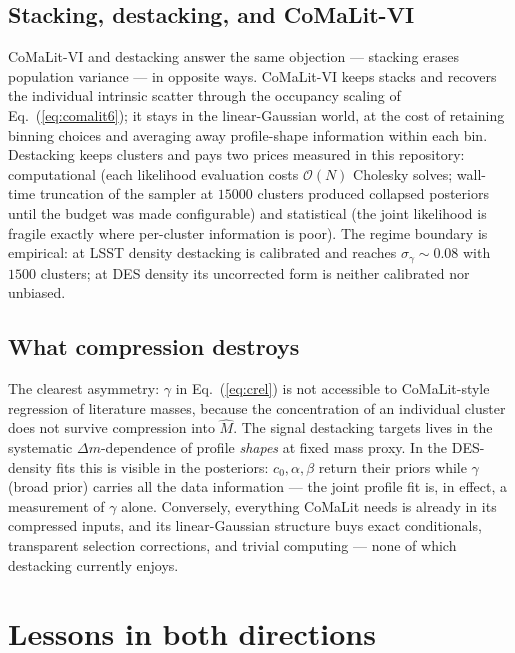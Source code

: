 \documentclass[11pt,a4paper]{article}
\begin{document}
\subsection{Stacking, destacking, and CoMaLit-VI}

CoMaLit-VI and destacking answer the same objection --- stacking erases
population variance --- in opposite ways. CoMaLit-VI keeps stacks and
recovers the individual intrinsic scatter through the occupancy scaling of
Eq.~(\ref{eq:comalit6}); it stays in the linear-Gaussian world, at the cost
of retaining binning choices and averaging away profile-shape information
within each bin. Destacking keeps clusters and pays two prices measured in
this repository: computational (each likelihood evaluation costs
$\mathcal{O}(N)$ Cholesky solves; wall-time truncation of the sampler at
$15000$ clusters produced collapsed posteriors until the budget was made
configurable) and statistical (the joint likelihood is fragile exactly
where per-cluster information is poor). The regime boundary is empirical:
at LSST density destacking is calibrated and reaches
$\sigma_\gamma\!\sim\!0.08$ with $1500$ clusters; at DES density its
uncorrected form is neither calibrated nor unbiased.

\subsection{What compression destroys}

The clearest asymmetry: $\gamma$ in Eq.~(\ref{eq:crel}) is not accessible
to CoMaLit-style regression of literature masses, because the
concentration of an individual cluster does not survive compression into
$\hat M$. The signal destacking targets lives in the systematic
$\Delta m$-dependence of profile \emph{shapes} at fixed mass proxy. In the
DES-density fits this is visible in the posteriors: $c_0, \alpha, \beta$
return their priors while $\gamma$ (broad prior) carries all the data
information --- the joint profile fit is, in effect, a measurement of
$\gamma$ alone. Conversely, everything CoMaLit needs is already in its
compressed inputs, and its linear-Gaussian structure buys exact
conditionals, transparent selection corrections, and trivial computing ---
none of which destacking currently enjoys.

\section{Lessons in both directions}
\label{sec:lessons}
\end{document}
